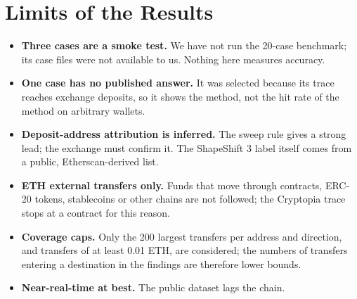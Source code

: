 \section{Limits of the Results}
\begin{itemize}
\item \textbf{Three cases are a smoke test.} We have not run the 20-case benchmark; its case files were not available to us. Nothing here measures accuracy.
\item \textbf{One case has no published answer.} It was selected because its trace reaches exchange deposits, so it shows the method, not the hit rate of the method on arbitrary wallets.
\item \textbf{Deposit-address attribution is inferred.} The sweep rule gives a strong lead; the exchange must confirm it. The ShapeShift 3 label itself comes from a public, Etherscan-derived list.
\item \textbf{ETH external transfers only.} Funds that move through contracts, ERC-20 tokens, stablecoins or other chains are not followed; the Cryptopia trace stops at a contract for this reason.
\item \textbf{Coverage caps.} Only the 200 largest transfers per address and direction, and transfers of at least 0.01 ETH, are considered; the numbers of transfers entering a destination in the findings are therefore lower bounds.
\item \textbf{Near-real-time at best.} The public dataset lags the chain.
\end{itemize}
